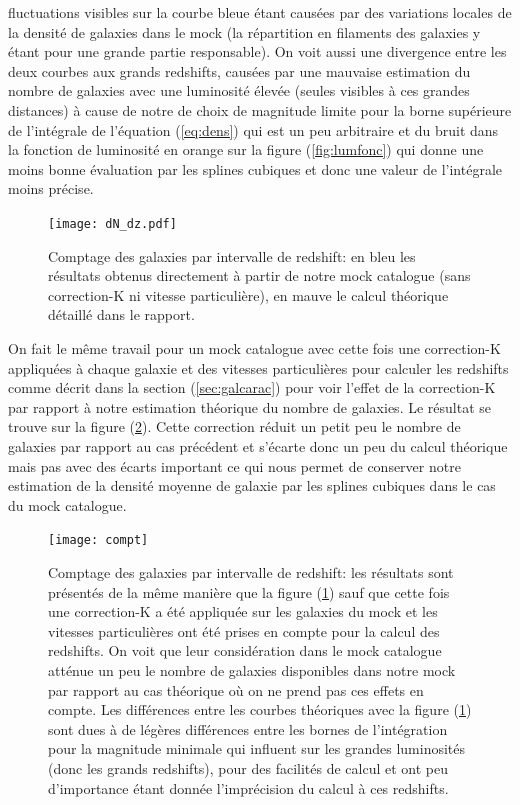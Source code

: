 fluctuations visibles sur la courbe bleue étant causées par des variations locales de la densité de galaxies dans le mock (la
répartition en filaments des galaxies y étant pour une grande partie responsable). On voit aussi une divergence entre les deux
courbes aux grands redshifts, causées par une mauvaise estimation du nombre de galaxies avec une luminosité élevée (seules visibles
à ces grandes distances) à cause de notre de choix de magnitude limite pour la borne supérieure de l'intégrale de l'équation
(\ref{eq:dens}) qui est un peu arbitraire et du bruit dans la fonction de luminosité en orange sur la figure (\ref{fig:lumfonc})
qui donne une moins bonne évaluation par les splines cubiques et donc une valeur de l'intégrale moins précise.
\begin{figure}[htb]
	\centering
	\texttt{[image: dN\_dz.pdf]}
	\caption{\footnotesize{}Comptage des galaxies par intervalle de redshift: en bleu les résultats obtenus directement à
	partir de notre mock catalogue (sans correction-K ni vitesse particulière), en mauve le calcul théorique détaillé dans le
	rapport.}
	\label{fig:dN_dz}
\end{figure}

On fait le même travail pour un mock catalogue avec cette fois une correction-K appliquées à chaque galaxie et des vitesses
particulières pour calculer les redshifts comme décrit dans la section (\ref{sec:galcarac}) pour voir l'effet de la correction-K
par rapport à notre estimation théorique du nombre de galaxies. Le résultat se trouve sur la figure (\ref{fig:compt}). Cette
correction réduit un petit peu le nombre de galaxies par rapport au cas précédent et s'écarte donc un peu du calcul théorique mais
pas avec des écarts important ce qui nous permet de conserver notre estimation de la densité moyenne de galaxie par les splines
cubiques dans le cas du mock catalogue.
\begin{figure}[htb]
	\centering
	\texttt{[image: compt]}
	\caption{\footnotesize{}Comptage des galaxies par intervalle de redshift: les résultats sont présentés de la même manière
	que la figure (\ref{fig:dN_dz}) sauf que cette fois une correction-K a été appliquée sur les galaxies du mock et les
	vitesses particulières ont été prises en compte pour la calcul des redshifts. On voit que leur considération dans le mock
	catalogue atténue un peu le nombre de galaxies disponibles dans notre mock par rapport au cas théorique où on ne prend pas
	ces effets en compte. Les différences entre les courbes théoriques avec la figure (\ref{fig:dN_dz}) sont dues à de légères
	différences entre les bornes de l'intégration pour la magnitude minimale qui influent sur les grandes luminosités (donc les
	grands redshifts), pour des facilités de calcul et ont peu d'importance étant donnée l'imprécision du calcul à ces
	redshifts.}
	\label{fig:compt}
\end{figure}

